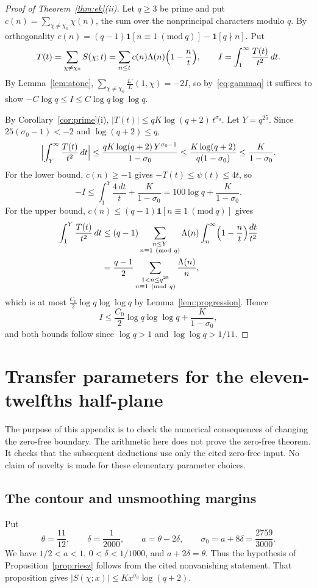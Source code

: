 \documentclass[screen,reqno]{aomart}
\numberwithin{equation}{section}
\theoremstyle{definition}
\begin{document}
\begin{proof}[Proof of Theorem~\ref{thm:ek}(ii)]
Let $q\ge3$ be prime and put $c(n)=\sum_{\chi\ne\chi_0}\chi(n)$, the sum over the nonprincipal
characters modulo $q$. By orthogonality $c(n)=(q-1)\mathbf 1[n\equiv1\ (\mathrm{mod}\ q)]
-\mathbf 1[q\nmid n]$. Put
\[
  T(t)=\sum_{\chi\ne\chi_0}S(\chi;t)=\sum_{n\le t}c(n)\Lambda(n)\Bigl(1-\frac nt\Bigr),\qquad
  I=\int_1^\infty\frac{T(t)}{t^2}\,dt.
\]
By Lemma~\ref{lem:atone}, $\sum_{\chi\ne\chi_0}\frac{L'}{L}(1,\chi)=-2I$, so by~\eqref{eq:gammaq}
it suffices to show $-C\log q\le I\le C\log q\log\log q$.

By Corollary~\ref{cor:prime}(i), $|T(t)|\le qK\log(q+2)\,t^{\sigma_0}$. Let $Y=q^{25}$. Since
$25(\sigma_0-1)<-2$ and $\log(q+2)\le q$,
\[
  \Bigl|\int_Y^\infty\frac{T(t)}{t^2}\,dt\Bigr|\le\frac{qK\log(q+2)\,Y^{\sigma_0-1}}{1-\sigma_0}
  \le\frac{K\log(q+2)}{q(1-\sigma_0)}\le\frac K{1-\sigma_0}.
\]
For the lower bound, $c(n)\ge-1$ gives $-T(t)\le\psi(t)\le4t$, so
\[
  -I\le\int_1^Y\frac{4\,dt}t+\frac K{1-\sigma_0}=100\log q+\frac K{1-\sigma_0}.
\]
For the upper bound, $c(n)\le(q-1)\mathbf 1[n\equiv1\ (\mathrm{mod}\ q)]$ gives
\begin{align*}
  \int_1^Y\frac{T(t)}{t^2}\,dt&\le(q-1)\sum_{\substack{n\le Y\\n\equiv1\ (\mathrm{mod}\ q)}}
  \Lambda(n)\int_n^\infty\Bigl(1-\frac nt\Bigr)\frac{dt}{t^2}\\
  &=\frac{q-1}2\sum_{\substack{1<n\le q^{25}\\n\equiv1\ (\mathrm{mod}\ q)}}\frac{\Lambda(n)}n,
\end{align*}
which is at most $\frac{C_0}2\log q\log\log q$ by Lemma~\ref{lem:progression}. Hence
\[
  I\le\frac{C_0}2\log q\log\log q+\frac K{1-\sigma_0},
\]
and both bounds follow since $\log q>1$ and $\log\log q>1/11$.
\end{proof}

\appendix
\section{Transfer parameters for the eleven-twelfths half-plane}
\label{app:parameters}

The purpose of this appendix is to check the numerical consequences of
changing the zero-free boundary. The arithmetic here does not prove the
zero-free theorem. It checks that the subsequent deductions use only the
cited zero-free input. No claim of novelty is made for these
elementary parameter choices.

\subsection{The contour and unsmoothing margins}
Put
\[
 \theta=\frac{11}{12},\qquad \delta=\frac1{2000},\qquad
 a=\theta-2\delta,\qquad
 \sigma_0=a+8\delta=\frac{2759}{3000}.
\]
We have $1/2<a<1$, $0<\delta<1/1000$, and $a+2\delta=\theta$.
Thus the hypothesis of Proposition~\ref{prop:riesz} follows from the
cited nonvanishing statement. That proposition gives
$|S(\chi;x)|\le Kx^{\sigma_0}\log(q+2)$.
\end{document}
